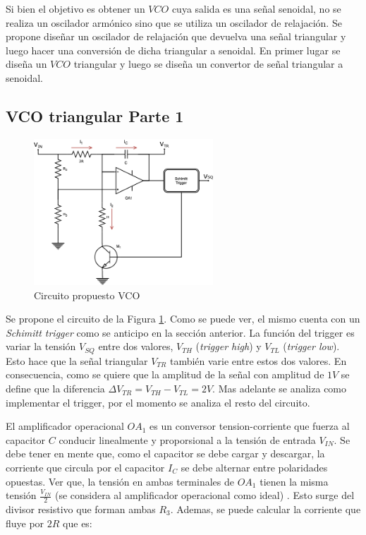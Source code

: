 Si bien el objetivo es obtener un $VCO$ cuya salida es una señal senoidal, no se realiza un oscilador armónico sino que se utiliza un oscilador de relajación. Se propone diseñar un oscilador de relajación que devuelva una señal triangular y luego hacer una conversión de dicha triangular a senoidal. En primer lugar se diseña un $VCO$ triangular y luego se diseña un convertor de señal triangular a senoidal. 

\subsection{VCO triangular Parte 1}


\begin{figure}[h!]                                                       
    \centering\includegraphics[width=0.6\textwidth]{../Ex3/Resources/circuito_propuesto_1.png}
    \caption{Circuito propuesto VCO}
    \label{fig:VCO_circuito_propuesto_1}
    \end{figure}


Se propone el circuito de la Figura \ref{fig:VCO_circuito_propuesto_1}. Como se puede ver, el mismo cuenta con un \textit{Schimitt trigger} como se anticipo en la sección anterior. La función del trigger es variar la tensión $V_{SQ}$ entre dos valores, $V_{TH}$ (\textit{trigger high}) y $V_{TL}$ (\textit{trigger low}). Esto hace que la señal triangular $V_{TR}$ también varie entre estos dos valores. En consecuencia, como se quiere que la amplitud de la señal con amplitud de $1V$ se define que la diferencia $\Delta V_{TR} = V_{TH} - V_{TL} = 2V$. Mas adelante se analiza como implementar el trigger, por el momento se analiza el resto del circuito.  

El amplificador operacional $OA_1$ es un conversor tension-corriente que fuerza al capacitor $C$ conducir linealmente y proporsional a la tensión de entrada $V_{IN}$. Se debe tener en mente que, como el capacitor se debe cargar y descargar, la corriente que circula por el capacitor $I_C$ se debe alternar entre polaridades opuestas. Ver que, la tensión en ambas terminales de $OA_1$ tienen la misma tensión $\frac{V_{IN}}{2}$ (se considera al amplificador operacional como ideal) . Esto surge del divisor resistivo que forman ambas $R_3$. Ademas, se puede calcular la corriente que fluye por $2R$ que es:

